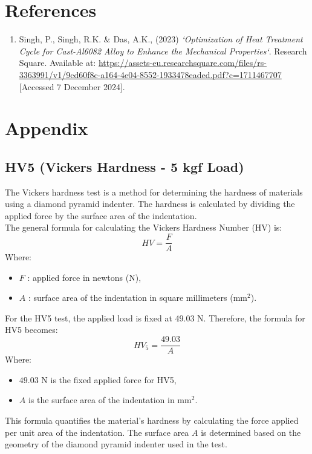 \documentclass{article}
\begin{document}
    \newpage\vspace*{-5pt}
    \section{References}
    \begin{enumerate}
        \item Singh, P., Singh, R.K. \& Das, A.K., (2023) \textit{‘Optimization of Heat Treatment Cycle for Cast-Al6082 Alloy to Enhance the Mechanical Properties‘}. Research Square. Available at: 	\url{https://assets-eu.researchsquare.com/files/rs-3363991/v1/9cd60f8c-a164-4e04-8552-1933478eaded.pdf?c=1711467707} [Accessed 7 December 2024]. 
    \end{enumerate}
    
    \newpage\vspace*{-5pt}
    
   
    
\section{Appendix}
\normalsize
\renewcommand{\thesubsection}{\Alph{subsection}}
\subsection{HV5 (Vickers Hardness - 5 kgf Load)}
The Vickers hardness test is a method for determining the hardness of materials using a diamond pyramid indenter. The hardness is calculated by dividing the applied force by the surface area of the indentation.\\[1em]
The general formula for calculating the Vickers Hardness Number (HV) is:
\begin{equation}
    HV = \frac{F}{A}
\end{equation}
Where:
\begin{itemize}[itemsep=-1mm]
    \item \( F \) : applied force in newtons (N),
    \item \( A \) : surface area of the indentation in square millimeters (mm\(^2\)).
\end{itemize}
For the HV5 test, the applied load is fixed at 49.03 N. Therefore, the formula for HV5 becomes:
\begin{equation}
    HV_5 = \frac{49.03}{A}
\end{equation}
Where:
\begin{itemize}[itemsep=-1mm]
    \item \( 49.03 \) N is the fixed applied force for HV5,
    \item \( A \) is the surface area of the indentation in mm\(^2\).
\end{itemize}
This formula quantifies the material's hardness by calculating the force applied per unit area of the indentation. The surface area \( A \) is determined based on the geometry of the diamond pyramid indenter used in the test.
\end{document}
